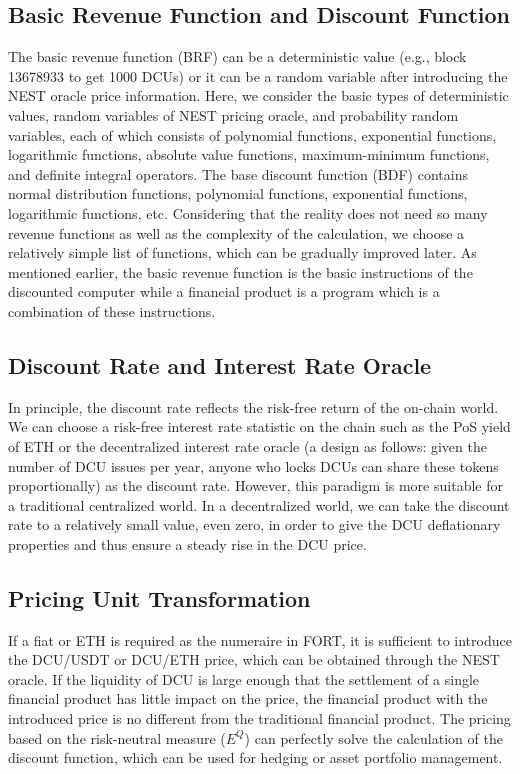 \documentclass[letterpaper,12pt]{article}
\begin{document}
\subsection{Basic Revenue Function and Discount Function}

The basic revenue function (BRF) can be a deterministic value (e.g., block 13678933 to get 1000 DCUs) or it can be a random variable after introducing the NEST oracle price information. 
Here, we consider the basic types of deterministic values, random variables of NEST pricing oracle, and probability random variables, each of which consists of polynomial functions, exponential functions, logarithmic functions, absolute value functions, maximum-minimum functions, and definite integral operators. 
The base discount function (BDF) contains normal distribution functions, polynomial functions, exponential functions, logarithmic functions, etc. 
Considering that the reality does not need so many revenue functions as well as the complexity of the calculation, we choose a relatively simple list of functions, which can be gradually improved later.
As mentioned earlier, the basic revenue function is the basic instructions of the discounted computer while a financial product is a program which is a combination of these instructions.

\subsection{Discount Rate and Interest Rate Oracle}

In principle, the discount rate reflects the risk-free return of the on-chain world. 
We can choose a risk-free interest rate statistic on the chain such as the PoS yield of ETH or the decentralized interest rate oracle (a design as follows: given the number of DCU issues per year, anyone who locks DCUs can share these tokens proportionally) as the discount rate. 
However, this paradigm is more suitable for a traditional centralized world. In a decentralized world, we can take the discount rate to a relatively small value, even zero, in order to give the DCU deflationary properties and thus ensure a steady rise in the DCU price.

\subsection{Pricing Unit Transformation}

If a fiat or ETH is required as the numeraire in FORT, it is sufficient to introduce the DCU/USDT or DCU/ETH price, which can be obtained through the NEST oracle. If the liquidity of DCU is large enough that the settlement of a single financial product has little impact on the price, the financial product with the introduced price is no different from the traditional financial product. The pricing based on the risk-neutral measure ($E^Q$) can perfectly solve the calculation of the discount function, which can be used for hedging or asset portfolio management.
\end{document}

